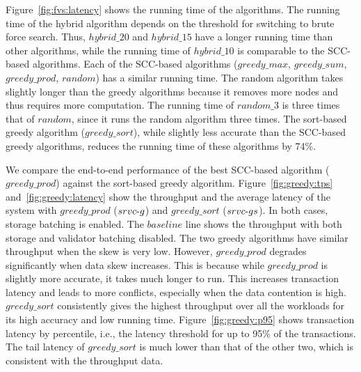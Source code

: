 Figure~\ref{fig:fvs:latency} shows the running time of the algorithms. The running time of the hybrid algorithm depends on the threshold for switching to brute force search. Thus, $hybrid\_20$ and $hybrid\_15$ have a longer running time than other algorithms, while the running time of $hybrid\_10$ is comparable to the SCC-based algorithms. Each of the SCC-based algorithms ($greedy\_max$, $greedy\_sum$, $greedy\_prod$, $random$) has a similar running time. The random algorithm takes slightly longer than the greedy algorithms because it removes more nodes and thus requires more computation. The running time of $random\_3$ is three times that of $random$, since it runs the random algorithm three times. The sort-based greedy algorithm ($greedy\_sort$), while slightly less accurate than the SCC-based greedy algorithms, reduces the running time of these algorithms by 74\%. 

We compare the end-to-end performance of the best SCC-based algorithm ($greedy\_prod$) against the sort-based greedy algorithm. Figure~\ref{fig:greedy:tps} and~\ref{fig:greedy:latency} show the  throughput and the average latency of the system with $greedy\_prod$ ($srvc\hbox{-}g$) and $greedy\_sort$ ($srvc\hbox{-}gs$). In both cases, storage batching is enabled. The $baseline$ line shows the throughput with both storage and validator batching disabled. 
The two greedy algorithms have similar throughput when the skew is very low. However, $greedy\_prod$ degrades significantly when data skew increases. This is because while $greedy\_prod$ is slightly more accurate, it takes much longer to run. This increases transaction latency and leads to more conflicts, especially when the data contention is high. $greedy\_sort$ consistently gives the highest throughput over all the workloads for its high accuracy and low running time. 
Figure~\ref{fig:greedy:p95} shows transaction latency by percentile, i.e., the latency threshold for up to 95\% of the transactions. The tail latency of $greedy\_sort$ is much lower than that of the other two, which is consistent with the throughput data.

